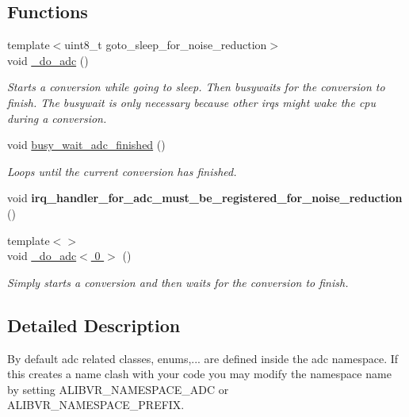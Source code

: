 \subsection*{Functions}
\begin{DoxyCompactItemize}
\item 
{\footnotesize template$<$uint8\+\_\+t goto\+\_\+sleep\+\_\+for\+\_\+noise\+\_\+reduction$>$ }\\void \hyperlink{namespaceadc_ab569dff590b3bb745fb012aa29ec5723}{\+\_\+do\+\_\+adc} ()
\begin{DoxyCompactList}\small\item\em Starts a conversion while going to sleep. Then busywaits for the conversion to finish. The busywait is only necessary because other irqs might wake the cpu during a conversion. \end{DoxyCompactList}\item 
\hypertarget{namespaceadc_a4228912d1c32eafc1987a8adb80f4984}{}\label{namespaceadc_a4228912d1c32eafc1987a8adb80f4984} 
void \hyperlink{namespaceadc_a4228912d1c32eafc1987a8adb80f4984}{busy\+\_\+wait\+\_\+adc\+\_\+finished} ()
\begin{DoxyCompactList}\small\item\em Loops until the current conversion has finished. \end{DoxyCompactList}\item 
\hypertarget{namespaceadc_a0f2e8fa37ba3e91fc9e7a58e3543eaaa}{}\label{namespaceadc_a0f2e8fa37ba3e91fc9e7a58e3543eaaa} 
void {\bfseries irq\+\_\+handler\+\_\+for\+\_\+adc\+\_\+must\+\_\+be\+\_\+registered\+\_\+for\+\_\+noise\+\_\+reduction} ()
\item 
{\footnotesize template$<$$>$ }\\void \hyperlink{namespaceadc_a6e0b185b550424440d92bc2b129f6128}{\+\_\+do\+\_\+adc$<$ 0 $>$} ()
\begin{DoxyCompactList}\small\item\em Simply starts a conversion and then waits for the conversion to finish. \end{DoxyCompactList}\end{DoxyCompactItemize}


\subsection{Detailed Description}
By default adc related classes, enums,... are defined inside the {\ttfamily adc} namespace. If this creates a name clash with your code you may modify the namespace name by setting A\+L\+I\+B\+V\+R\+\_\+\+N\+A\+M\+E\+S\+P\+A\+C\+E\+\_\+\+A\+DC or A\+L\+I\+B\+V\+R\+\_\+\+N\+A\+M\+E\+S\+P\+A\+C\+E\+\_\+\+P\+R\+E\+F\+IX. 

